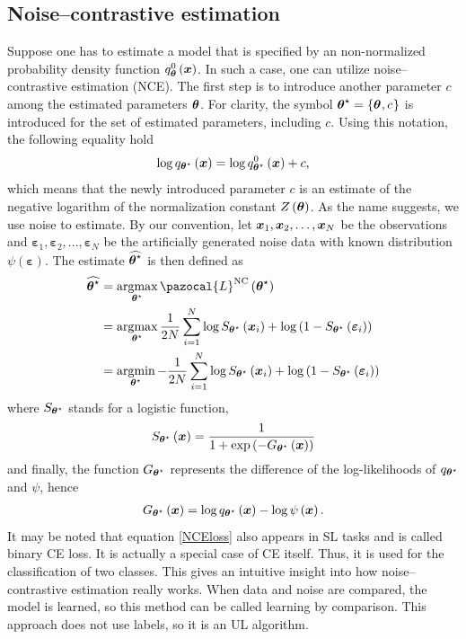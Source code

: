\subsection{Noise--contrastive estimation}
Suppose one has to estimate a model that is specified by an non-normalized probability density function $q^0_{\boldsymbol{\theta}}\left(\boldsymbol{x}\right)$. In such a case, one can utilize noise--contrastive estimation (NCE). The first step is to introduce another parameter $c$ among the estimated parameters $\boldsymbol{\theta}$. For clarity, the symbol $\boldsymbol{\theta}^\star=\left\lbrace\boldsymbol{\theta}^{},c^{}_{}\right\rbrace$ is introduced for the set of estimated parameters, including
$c$. Using this notation, the following equality hold
\begin{align}
    \log q_{\boldsymbol{\theta}^\star}\left(\boldsymbol{x}\right) = \log q_{\boldsymbol{\theta}^\star}^0\left(\boldsymbol{x}\right) + c,
    \end{align}
which means that the newly introduced parameter $c$ is an estimate of the negative logarithm of
the normalization constant $Z\left(\boldsymbol{\theta}\right)$.
As the name suggests, we use noise to estimate. By our convention, let $\boldsymbol{x}_1,\boldsymbol{x}_2,\dots,\boldsymbol{x}_N$
be the observations and $\boldsymbol{\varepsilon}_1,\boldsymbol{\varepsilon}_2,\dots,\boldsymbol{\varepsilon}_N$ be the artificially generated noise data with known distribution $\psi\left(\boldsymbol{\varepsilon}\right)$. The estimate $\widehat{\boldsymbol{\theta}^\star}$ is then defined as
\begin{align}
    \widehat{\bt^\star} &= \argmax_{\bt^\star} \pazocal{L}^{\mathrm{NC}}\left(\bt^\star\right)\\
   &= \argmax_{\bt^\star} \frac{1}{2N}\sum_{i=1}^N \log S_{\bt^\star}\left(\bx_i\right) + \log\left(1-S_{\bt^\star}\left(\boldsymbol{\varepsilon}_i\right) \right)\label{NCEloss}\\
   &= \argmin_{\bt^\star} -\frac{1}{2N}\sum_{i=1}^N \log S_{\bt^\star}\left(\bx_i\right) + \log\left(1-S_{\bt^\star}\left(\boldsymbol{\varepsilon}_i\right) \right)
\end{align}
where $S_{\boldsymbol{\theta}^\star}$ stands for a logistic function,
\begin{align}
S_{\boldsymbol{\theta}^\star}\left(\boldsymbol{x}\right) = \frac{1}{1 + \exp\left(-G_{\boldsymbol{\theta}^\star}\left(\boldsymbol{x}\right) \right)}
\end{align}
and finally, the function $G_{\boldsymbol{\theta}^\star}$ represents the difference of the log-likelihoods of $q_{\boldsymbol{\theta}^\star}$ and $\psi$, hence 
\begin{align}
    G_{\boldsymbol{\theta}^\star}\left(\boldsymbol{x}\right) = \log q_{\boldsymbol{\theta}^\star}\left(\boldsymbol{x} \right) - \log\psi\left(\boldsymbol{x} \right).
\end{align}
It may be noted that equation \eqref{NCEloss} also appears in SL tasks and is called binary
CE loss. It is actually a special case of CE itself. Thus, it is used for the classification of two classes. This gives an intuitive insight into how noise--contrastive estimation
really works. When data and noise are compared, the model is learned, so this method can be called
learning by comparison. This approach does not use labels, so it is an UL algorithm. 

